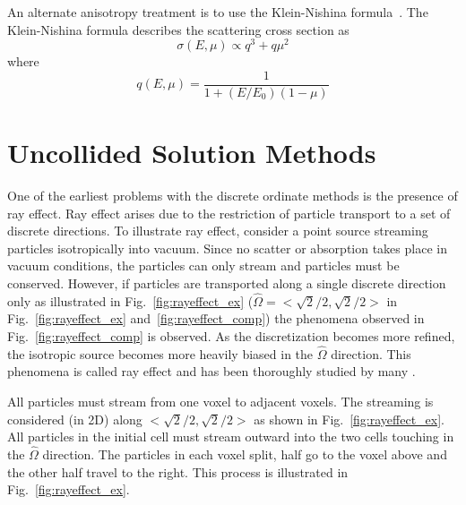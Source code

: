 An alternate anisotropy treatment is to use the Klein-Nishina formula~\citep{ref:shultisj}. The Klein-Nishina formula describes the scattering cross section as
\begin{equation}
\sigma(E, \mu) \propto q^3 + q\mu^2
\end{equation}
where
\begin{equation}
q(E, \mu) = \frac{1}{1 + (E/E_0)(1-\mu)}
\end{equation}

\section{Uncollided Solution Methods}\label{sec:uncol}
One of the earliest problems with the discrete ordinate methods is the presence of ray effect. Ray effect arises due to the restriction of particle transport to a set of discrete directions. To illustrate ray effect, consider a point source streaming particles isotropically into vacuum. Since no scatter or absorption takes place in vacuum conditions, the particles can only stream and particles must be conserved. However, if particles are transported along a single discrete direction only as illustrated in Fig.~\ref{fig:rayeffect_ex} ($\hat{\Omega} = <\sqrt{2}/2, \sqrt{2}/2>$ in Fig.~\ref{fig:rayeffect_ex} and~\ref{fig:rayeffect_comp}) the phenomena observed in Fig.~\ref{fig:rayeffect_comp} is observed. As the discretization becomes more refined, the isotropic source becomes more heavily biased in the $\hat{\Omega}$ direction. This phenomena is called ray effect and has been thoroughly studied by many \citep{ref:mathewsk} \citep{ref:tencerj}.

All particles must stream from one voxel to adjacent voxels. The streaming is considered (in 2D) along $<\sqrt{2}/2, \sqrt{2}/2>$ as shown in Fig.~\ref{fig:rayeffect_ex}. All particles in the initial cell must stream outward into the two cells touching in the $\hat{\Omega}$ direction. The particles in each voxel split, half go to the voxel above and the other half travel to the right. This process is illustrated in Fig.~\ref{fig:rayeffect_ex}.

